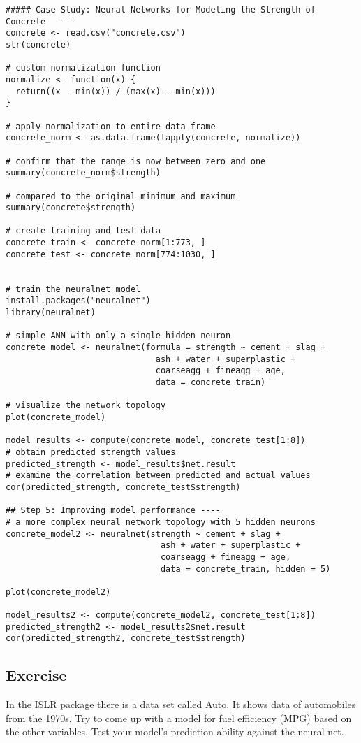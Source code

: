 \documentclass{article}
\begin{document}
\begin{verbatim}
##### Case Study: Neural Networks for Modeling the Strength of Concrete  ----
concrete <- read.csv("concrete.csv")
str(concrete)

# custom normalization function
normalize <- function(x) {
  return((x - min(x)) / (max(x) - min(x)))
}

# apply normalization to entire data frame
concrete_norm <- as.data.frame(lapply(concrete, normalize))

# confirm that the range is now between zero and one
summary(concrete_norm$strength)

# compared to the original minimum and maximum
summary(concrete$strength)

# create training and test data
concrete_train <- concrete_norm[1:773, ]
concrete_test <- concrete_norm[774:1030, ]


# train the neuralnet model
install.packages("neuralnet")
library(neuralnet)

# simple ANN with only a single hidden neuron
concrete_model <- neuralnet(formula = strength ~ cement + slag +
                              ash + water + superplastic +
                              coarseagg + fineagg + age,
                              data = concrete_train)

# visualize the network topology
plot(concrete_model)

model_results <- compute(concrete_model, concrete_test[1:8])
# obtain predicted strength values
predicted_strength <- model_results$net.result
# examine the correlation between predicted and actual values
cor(predicted_strength, concrete_test$strength)

## Step 5: Improving model performance ----
# a more complex neural network topology with 5 hidden neurons
concrete_model2 <- neuralnet(strength ~ cement + slag +
                               ash + water + superplastic +
                               coarseagg + fineagg + age,
                               data = concrete_train, hidden = 5)

plot(concrete_model2)

model_results2 <- compute(concrete_model2, concrete_test[1:8])
predicted_strength2 <- model_results2$net.result
cor(predicted_strength2, concrete_test$strength)
\end{verbatim}

\subsection{Exercise}
In the ISLR package there is a data set called Auto. It shows data of automobiles from the 1970s. Try to come up with a model for fuel efficiency (MPG) based on the other variables. Test your model's prediction ability against the neural net.
\end{document}
